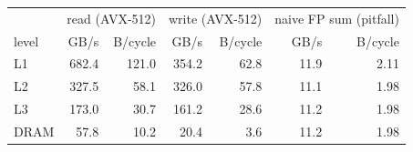 \begin{tabular}{lrrrrrr}
\toprule
 & \multicolumn{2}{c}{read (AVX-512)} & \multicolumn{2}{c}{write (AVX-512)} & \multicolumn{2}{c}{naive FP sum (pitfall)} \\
level & GB/s & B/cycle & GB/s & B/cycle & GB/s & B/cycle \\
\midrule
L1 & 682.4 & 121.0 & 354.2 & 62.8 & 11.9 & 2.11 \\
L2 & 327.5 & 58.1 & 326.0 & 57.8 & 11.1 & 1.98 \\
L3 & 173.0 & 30.7 & 161.2 & 28.6 & 11.2 & 1.98 \\
DRAM & 57.8 & 10.2 & 20.4 & 3.6 & 11.2 & 1.98 \\
\bottomrule
\end{tabular}
